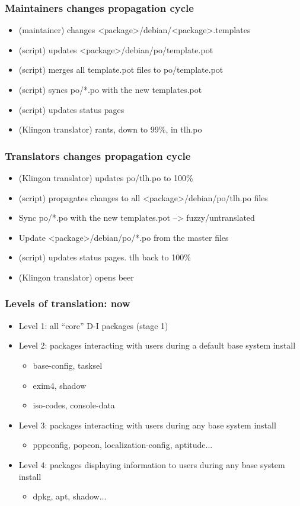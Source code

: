 \documentclass{beamer}
\begin{document}
\begin{frame}
  \frametitle{Maintainers changes propagation cycle}
	\begin{itemize}
	\item
		(maintainer) changes <package>/debian/<package>.templates
	\item
		(script) updates <package>/debian/po/template.pot
	\item
		(script) merges all template.pot files to po/template.pot
	\item
		(script) syncs po/*.po with the new templates.pot
	\item
		(script) updates status pages
	\item
		(Klingon translator) rants, down to 99\%, in tlh.po
	\end{itemize}
\end{frame}

\begin{frame}
  \frametitle{Translators changes propagation cycle}
	\begin{itemize}
	\item
		(Klingon translator) updates po/tlh.po to 100\%
	\item
		(script) propagates changes to all <package>/debian/po/tlh.po files	\item
		Sync po/*.po with the new templates.pot --> fuzzy/untranslated
	\item
		Update <package>/debian/po/*.po from the master files

	\item
		(script) updates status pages. tlh back to 100\%
	\item
		(Klingon translator) opens beer
	\end{itemize}
\end{frame}

\begin{frame}
  \frametitle{Levels of translation: now}
	\begin{itemize}
	\item
		Level 1: all ``core'' D-I packages (stage 1)
	\item
		Level 2: packages interacting with users during a default base system install
		\begin{itemize}
			\item
				base-config, tasksel
			\item
				exim4, shadow
			\item
				iso-codes, console-data
		\end{itemize}
	\item
		Level 3: packages interacting with users during any base system install
		\begin{itemize}
			\item
				pppconfig, popcon, localization-config, aptitude...
		\end{itemize}
		\item
			Level 4: packages displaying information to users during any base system install
		\begin{itemize}
			\item
				dpkg, apt, shadow...
		\end{itemize}
	\end{itemize}
\end{frame}
\end{document}
